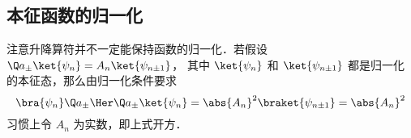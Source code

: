 \subsection{本征函数的归一化}
注意升降算符并不一定能保持函数的归一化．若假设 $\Q a_\pm \ket{\psi_n} = A_n \ket{\psi_{n\pm 1}}$， 其中 $\ket{\psi_n}$ 和 $\ket{\psi_{n \pm 1}}$ 都是归一化的本征态，那么由归一化条件要求
\begin{equation}
\bra{\psi_n} \Q a_\pm\Her \Q a_\pm \ket{\psi_n} = \abs{A_n}^2 \braket{\psi_{n\pm 1}} = \abs{A_n}^2
\end{equation}
习惯上令 $A_n$ 为实数，即上式开方． 















